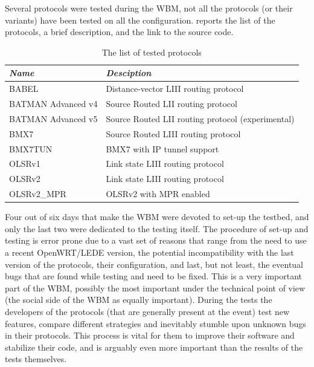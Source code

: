 \documentclass[10pt,onecolumn]{paper}
\begin{document}
Several protocols were tested during the WBM, not all the protocols (or their
variants) have been tested on all the configuration. 
reports the list of the protocols, a brief description, and the link to the
source code. 

\begin{table}
    \centering
    \begin{tabular}{ll}
        \emph{Name} & \emph{Desciption} \\
        \midrule
        BABEL & Distance-vector LIII routing protocol \\
        BATMAN Advanced v4 & Source Routed LII routing protocol \\
        BATMAN Advanced v5 & Source Routed LII routing protocol (experimental)\\
        BMX7  & Source Routed LIII routing protocol \\
        BMX7TUN   & BMX7 with IP tunnel support\\
        OLSRv1 &  Link state LIII routing protocol\\
        OLSRv2 &  Link state LIII routing protocol\\
        OLSRv2\_MPR  & OLSRv2 with MPR enabled\\
        \bottomrule
    \end{tabular}
    \caption{The list of tested protocols}
    \label{tab:protocols}
\end{table}

Four out of six days that make the WBM were devoted to set-up the testbed, and
only the last two were dedicated to the testing itself. The procedure of set-up
and testing is error prone due to a vast set of reasons that range from the need
to use a recent OpenWRT/LEDE version, the potential incompatibility with the
last version of the protocols, their configuration, and last, but not least, the
eventual bugs that are found while testing and need to be fixed. This is a very
important part of the WBM, possibly the most important under the technical
point of view (the social side of the WBM as equally important). During the
tests the developers of the protocols (that are generally present at the event)
test new features, compare different strategies and inevitably stumble upon
unknown bugs in their protocols. This process is vital for them to improve their
software and stabilize their code, and is arguably even more important than the
results of the tests themselves. 
\end{document}
